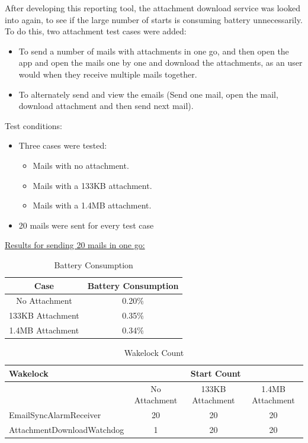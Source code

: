 After developing this reporting tool, the attachment download service was looked into again, to see if the large number of starts is consuming battery unnecessarily. To do this, two attachment test cases were added:
\begin{itemize}
	\item To send a number of mails with attachments in one go, and then open the app and open the mails one by one and download the attachments, as an user would when they receive multiple mails together.
	\item To alternately send and view the emails (Send one mail, open the mail, download attachment and then send next mail).
\end{itemize}
Test conditions:
\begin{itemize}
	\item Three cases were tested:
	\begin{itemize}
		\item Mails with no attachment.
		\item Mails with a 133KB attachment.
		\item Mails with a 1.4MB attachment.
	\end{itemize}
	\item 20 mails were sent for every test case
\end{itemize}
\clearpage
\underline{Results for sending 20 mails in one go:} \\
\begin{table}[!h]
\centering
\caption{Battery Consumption}
\begin{tabular}{|c|c|}
\hline
Case & Battery Consumption\\ \hline
No Attachment & 0.20\%\\ \hline
133KB Attachment & 0.35\% \\ \hline
1.4MB Attachment & 0.34\% \\ \hline 
\end{tabular}
\end{table}
\begin{table}[!h]
\centering
\caption{Wakelock Count}
\label{my-label}
\begin{tabular}{|l|c|c|c|}
\hline
Wakelock                            & \multicolumn{3}{c|}{Start Count}                    \\ \hline
                                    & No Attachment & 133KB Attachment & 1.4MB Attachment \\ \hline
EmailSyncAlarmReceiver              & 20            & 20               & 20               \\ \hline
AttachmentDownloadWatchdog & 1             & 20               & 20               \\ \hline
\end{tabular}
\end{table}
